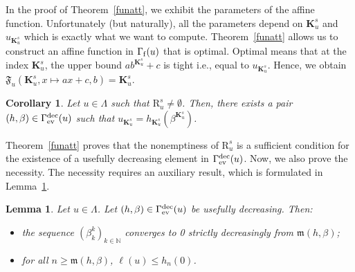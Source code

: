 \documentclass{article}
\def\ls#1{\boldsymbol{\ell}(#1)}
\def\funset{\Gamma}
\def\fmong{\funset_{{\rm ev}}^{\rm dec}}
\def\mon{\mathfrak{m}}
\def\secfunh{\funset_{\rm f}}
\def\Fu{\mathfrak{F}_u}
\def\nn{\mathbb N}
\def\bigks{\mathbf{K}^s}
\def\gls#1{{\mathrm R}_{#1}}
\def\gsls#1{\gls{#1}^s}
\newtheorem{lemma}{Lemma}
\newtheorem{coro}{Corollary}
\def\red#1{#1}
\def\blue#1{#1}
\begin{document}
	In the proof of Theorem~\ref{funatt}, we exhibit the parameters of the affine function. Unfortunately (but naturally), all the parameters depend on $\bigks_u$ and $u_{\bigks_u}$ \red{which} is exactly what we want to compute. Theorem~\ref{funatt} allows \red{us} to construct an affine function in $\secfunh(u)$ \red{that} is optimal. Optimal means that at the index $\bigks_u$, the upper bound $ab^{\bigks_u}+c$ is \blue{tight i.e.,} equal to $u_{\bigks_u}$. Hence, we obtain $\Fu(\bigks_u,x\mapsto ax+c,b)=\bigks_u$.
	
	\begin{coro}
		\label{maincoro}
		Let $u\in\Lambda$ such that $\gsls{u}\neq \emptyset$. Then, there exists a pair $(h,\beta)\in\fmong(u)$  such that $u_{\bigks_u}=h_{\bigks_u}(\beta^{\bigks_u})$.
	\end{coro}
	
	Theorem~\ref{funatt} proves that the nonemptiness of $\gsls{u}$ is a sufficient condition for the existence of a usefully decreasing element in $\fmong(u)$. Now, we also prove the necessity. The necessity requires an auxiliary result, \red{which is} formulated in Lemma~\ref{simpleproperty}.
	\begin{lemma}
		\label{simpleproperty}
		Let $u\in\Lambda$. Let $(h,\beta)\in\fmong(u)$ be usefully decreasing. Then:
		\begin{itemize}
			\item the sequence $(\beta_k^k)_{k\in\nn}$ converges to 0 strictly decreasingly from $\mon(h,\beta)$;
			\item for all $n\geq \mon(h,\beta)$, $\ls{u}\leq h_n(0)$.
		\end{itemize}
	\end{lemma}
	
\end{document}
